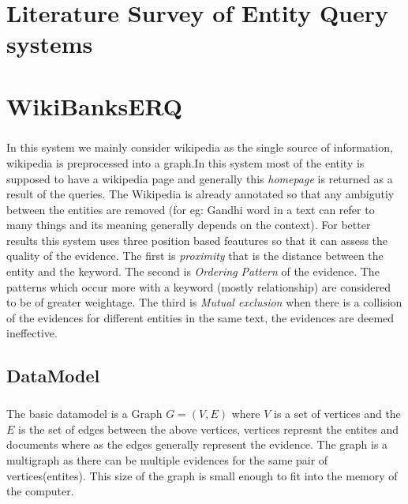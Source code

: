 \documentclass[a4paper,12pt]{report}
\begin{document}
\newpage
\chapter{Literature Survey of Entity Query systems}             %
\label{chap:litsurvey}

\paragraph*{}

\newpage
\chapter{WikiBanksERQ}             %
\label{wikibankserq}
\paragraph*{}
In this system we mainly consider wikipedia as the single source of information, wikipedia is preprocessed into a graph.In this system most of the entity is supposed to have a wikipedia page and generally this \textit{homepage} is returned as a result of the queries. The Wikipedia is already annotated so that any ambigutiy between the entities are removed (for eg: Gandhi word in a text can refer to many things and its meaning generally depends on the context). For better results this system uses three position based feautures so that it can assess the quality of the evidence. The first is \textit{proximity} that is the distance between the entity and the keyword. The second is \textit{Ordering Pattern} of the evidence. The patterns which occur more with a keyword (mostly relationship) are considered to be of greater weightage. The third is \textit{Mutual exclusion} when there is a collision of the evidences for different entities in the same text, the evidences are deemed ineffective.
\section{DataModel}
\paragraph*{}
The basic datamodel is a Graph $G = (V, E)$ where $V$ is a set of vertices and the $E$ is the set of edges between the above vertices, vertices represnt the entites and documents where as the edges generally represent the evidence. The graph is a multigraph as there can be multiple evidences for the same pair of vertices(entites). This size of the graph is small enough to fit into the memory of the computer.
\end{document}
